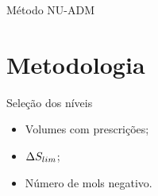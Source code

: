 \documentclass[professionalfont]{beamer}
\begin{document}




\begin{frame}{Método NU-ADM}
    \begin{figure}
        \begin{subfigure}{.48\textwidth}
            \centering
            \resizebox*{5cm}{!}{
            }
            \label{fig:multinivel.3.a}
        \end{subfigure}
        \begin{subfigure}{.48\textwidth}
            \centering
            \resizebox*{5cm}{!}{
            }
            \label{fig:multinivel.3.b}
        \end{subfigure}
        \label{fig:multinivel.2}
    \end{figure}

\end{frame}

\section{Metodologia}
\begin{frame}{Seleção dos níveis}
    \small
    \begin{itemize}
        \justifying
        \item Volumes com prescrições;
        \item $\Delta S_{lim}$;
        \item Número de mols negativo.
    \end{itemize}
\end{frame}
\end{document}
